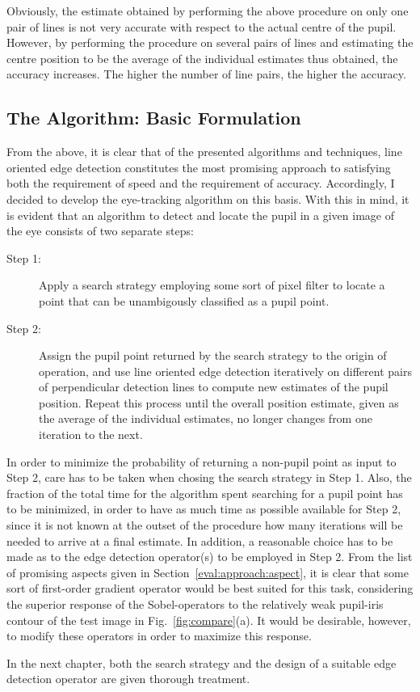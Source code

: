 Obviously, the estimate obtained by performing the above procedure on
only one pair of lines is not very accurate with respect to the actual
centre of the pupil.  However, by performing the procedure on several
pairs of lines and estimating the centre position to be the average of
the individual estimates thus obtained, the accuracy increases.  The
higher the number of line pairs, the higher the accuracy.

\subsection{The Algorithm: Basic Formulation}
\label{eval:approach:algo}

From the above, it is clear that of the presented algorithms and
techniques, line oriented edge detection constitutes the most
promising approach to satisfying both the requirement of speed and the
requirement of accuracy.  Accordingly, I decided to develop the
eye-tracking algorithm on this basis.  With this in mind, it is
evident that an algorithm to detect and locate the pupil in a given
image of the eye consists of two separate steps:

\begin{description}
\item[Step 1:] Apply a search strategy employing some sort of pixel
  filter to locate a point that can be unambigously classified as a
  pupil point.
\item[Step 2:] Assign the pupil point returned by the search strategy
  to the origin of operation, and use line oriented edge detection
  iteratively on different pairs of perpendicular detection lines to
  compute new estimates of the pupil position.  Repeat this process
  until the overall position estimate, given as the average of the
  individual estimates, no longer changes from one iteration to the
  next.
\end{description}

In order to minimize the probability of returning a non-pupil point as
input to Step 2, care has to be taken when chosing the search strategy
in Step 1.  Also, the fraction of the total time for the algorithm
spent searching for a pupil point has to be minimized, in order to
have as much time as possible available for Step 2, since it is not
known at the outset of the procedure how many iterations will be
needed to arrive at a final estimate.  In addition, a reasonable
choice has to be made as to the edge detection operator(s) to be
employed in Step 2.  From the list of promising aspects given in
Section~\ref{eval:approach:aspect}, it is clear that some sort of
first-order gradient operator would be best suited for this task,
considering the superior response of the Sobel-operators to the
relatively weak pupil-iris contour of the test image in
Fig.~\ref{fig:compare}(a).  It would be desirable, however, to modify
these operators in order to maximize this response.

In the next chapter, both the search strategy and the design of a
suitable edge detection operator are given thorough treatment.
